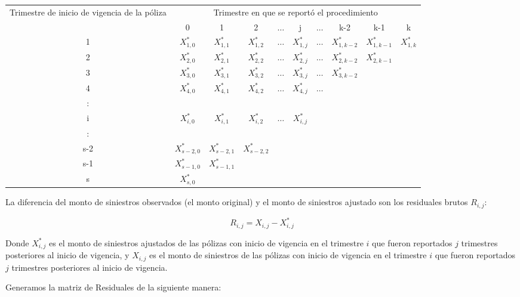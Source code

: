 \documentclass[11pt,twoside,openright,spanish]{report}
\numberwithin{equation}{chapter}
\numberwithin{figure}{chapter}
\numberwithin{table}{chapter}
\begin{document}
	\begin{table}[ht]
		\centering
		\begin{tabularx}{\linewidth}{ c|ccccccccc}
		\multirow{2}{4cm}{Trimestre de inicio de vigencia de la póliza}&  \multicolumn{9}{c}{Trimestre en que se reportó el procedimiento} \\
			& 0  & 1 & 2 & $ \dots $ & j & $\dots $ & k-2 & k-1 &  k \\
			\midrule
			1      &  $X_{1,0}^{*}$ & $X_{1,1}^{*}$ & $X_{1,2}^{*}$ & $ \dots $ & $X_{1,j}^{*}$ & $ \dots $ & $X_{1,k-2}^{*}$ & $X_{1,k-1}^{*}$ & $X_{1,k}^{*}$ \\
			2      &  $X_{2,0}^{*}$ & $X_{2,1}^{*}$ & $X_{2,2}^{*}$ & $ \dots $ & $X_{2,j}^{*}$ & $ \dots $ & $X_{2,k-2}^{*}$ & $X_{2,k-1}^{*}$ & \\
			3      &  $X_{3,0}^{*}$ & $X_{3,1}^{*}$ & $X_{3,2}^{*}$ & $ \dots $ & $X_{3,j}^{*}$ & $ \dots $ & $X_{3,k-2}^{*}$ & & \\
			4      &  $X_{4,0}^{*}$ & $X_{4,1}^{*}$ & $X_{4,2}^{*}$ & $ \dots $ & $X_{4,j}^{*}$ & $ \dots $ & & & \\
			:      & & & & & & & & &\\
			i      &  $X_{i,0}^{*}$ & $X_{i,1}^{*}$ & $X_{i,2}^{*}$ & $ \dots $ & $X_{i,j}^{*}$ & & & & \\
			:      & & & & & & & & & \\
			s-2      &  $X_{s-2,0}^{*}$ & $X_{s-2,1}^{*}$ & $X_{s-2,2}^{*}$ & & & & & & \\
			s-1      &  $X_{s-1,0}^{*}$ & $X_{s-1,1}^{*}$ & & & & & & & \\
			s      &  $X_{s,0}^{*}$ & & & & & & & & \\
		\end{tabularx}
	\end{table}
		
	La diferencia del monto de siniestros observados (el monto original) y el monto de siniestros ajustado son los residuales brutos $R_{i,j}^{}$:
		
	$$R_{i,j}^{}= X_{i,j}^{} - X_{i,j}^{*} $$ 
	
	Donde ${X}_{i,j}^{*}$ es el monto de siniestros ajustados de las pólizas con inicio de vigencia en el trimestre $i$ que fueron reportados $j$ trimestres posteriores al inicio de vigencia, y ${X}_{i,j}$ es el monto de siniestros de las pólizas con inicio de vigencia en el trimestre $i$ que fueron reportados $j$ trimestres posteriores al inicio de vigencia.	
	
	Generamos la matriz de Residuales de la siguiente manera:
\end{document}
